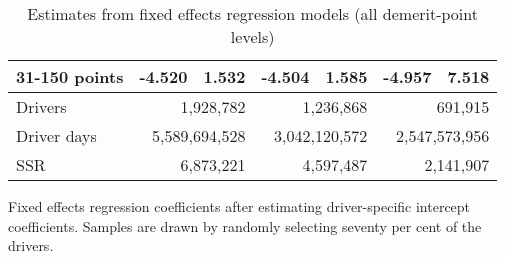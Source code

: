 \begin{table}
\begin{tabular}{l r r r r r r}
31-150 points  & -4.520  &  1.532  & -4.504  &  1.585  & -4.957  &  7.518   \\ 
 

\hline 
 

Drivers 
 & \multicolumn{2}{r}{1,928,782}  & \multicolumn{2}{r}{1,236,868}  & \multicolumn{2}{r}{691,915}   \\ 
 

Driver days 
 & \multicolumn{2}{r}{5,589,694,528}  & \multicolumn{2}{r}{3,042,120,572}  & \multicolumn{2}{r}{2,547,573,956}   \\ 
 

SSR 
 & \multicolumn{2}{r}{6,873,221}  & \multicolumn{2}{r}{4,597,487}  & \multicolumn{2}{r}{2,141,907}   \\ 
 

\hline 
 
\end{tabular} 
\caption{Estimates from fixed effects regression models (all demerit-point levels)} 
Fixed effects regression coefficients after estimating driver-specific intercept coefficients. 
Samples are drawn by randomly selecting seventy per cent of the drivers. 
\label{tab:FE_regs_all_pts} 
\end{table} 
 
